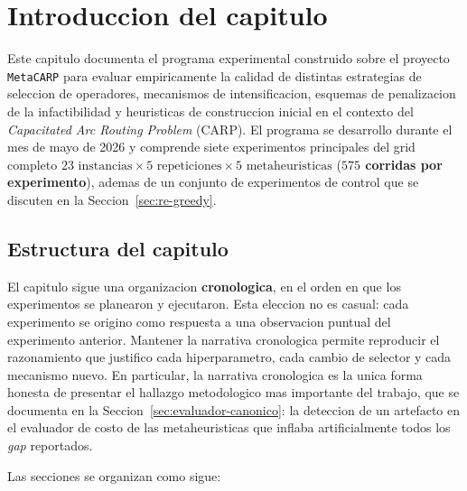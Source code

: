 \section{Introduccion del capitulo}

Este capitulo documenta el programa experimental construido sobre el
proyecto \texttt{MetaCARP} para evaluar empiricamente la calidad de
distintas estrategias de seleccion de operadores, mecanismos de
intensificacion, esquemas de penalizacion de la infactibilidad y
heuristicas de construccion inicial en el contexto del
\emph{Capacitated Arc Routing Problem} (CARP). El programa se
desarrollo durante el mes de mayo de 2026 y comprende siete
experimentos principales del grid completo $23\text{ instancias} \times
5\text{ repeticiones} \times 5\text{ metaheuristicas}$ (\textbf{$575$
corridas por experimento}), ademas de un conjunto de experimentos de
control que se discuten en la Seccion~\ref{sec:re-greedy}.

\subsection{Estructura del capitulo}

El capitulo sigue una organizacion \textbf{cronologica}, en el orden en
que los experimentos se planearon y ejecutaron. Esta eleccion no es
casual: cada experimento se origino como respuesta a una observacion
puntual del experimento anterior. Mantener la narrativa cronologica
permite reproducir el razonamiento que justifico cada hiperparametro,
cada cambio de selector y cada mecanismo nuevo. En particular, la
narrativa cronologica es la unica forma honesta de presentar el
hallazgo metodologico mas importante del trabajo, que se documenta en
la Seccion~\ref{sec:evaluador-canonico}: la deteccion de un artefacto
en el evaluador de costo de las metaheuristicas que inflaba
artificialmente todos los \emph{gap} reportados.

Las secciones se organizan como sigue:

